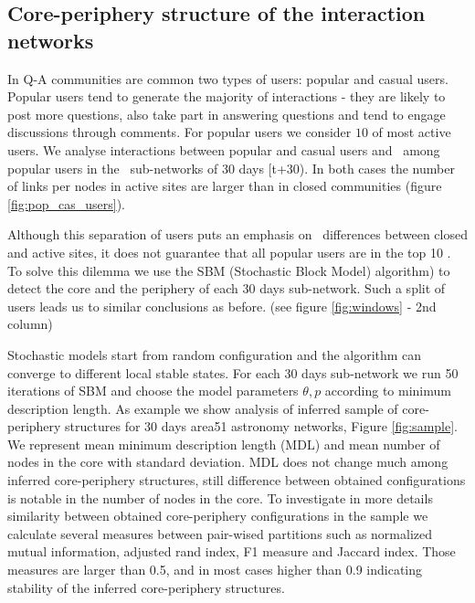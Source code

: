\subsection{Core-periphery structure of the interaction networks}


In Q-A communities are common two types of users: popular and casual users. Popular users tend to generate the majority of interactions - they are likely to post more questions, also take part in answering questions and tend to engage discussions through comments. For popular users we consider $10 $  of most active users. We analyse interactions between popular and casual users and  among popular users in the  sub-networks of 30 days [t+30). In both cases the number of links per nodes in active sites are larger than in closed communities (figure \ref{fig:pop_cas_users}).

Although this separation of users puts an emphasis on  differences between closed and active sites, it does not guarantee that all popular users are in the top 10 . To solve this dilemma we use the SBM (Stochastic Block Model) algorithm) to detect the core and the periphery of each 30 days sub-network. Such a split of users leads us to similar conclusions as before. (see figure \ref{fig:windows} - 2nd column)

Stochastic models start from random configuration and the algorithm  can converge to different local stable states. For each 30 days sub-network we run 50 iterations of SBM and choose the model parameters $\theta, p$ according to minimum description length. As example we show analysis of inferred sample of  core-periphery structures for 30 days area51 astronomy networks, Figure \ref{fig:sample}. We represent mean minimum description length (MDL) and mean number of nodes in the core with standard deviation. MDL does not change much among inferred core-periphery structures, still difference between obtained configurations is notable in the number of nodes in the core.  To investigate in more details similarity between obtained core-periphery configurations in the sample we calculate several measures between pair-wised partitions such as normalized mutual information, adjusted rand index, F1 measure and Jaccard index. Those measures are larger than 0.5, and in most cases higher than 0.9 indicating stability of the inferred core-periphery structures.

